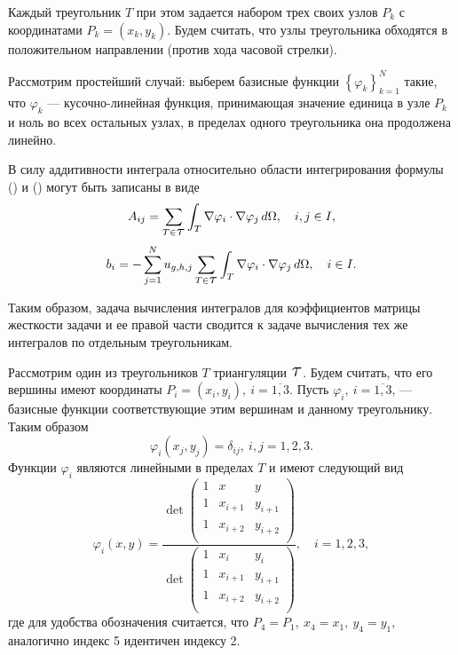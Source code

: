 \documentclass[12pt, a4paper]{article}
\renewcommand{\phi}{\varphi}
\newcommand\Tau{\scalerel*{\tau}{T}}
\begin{document}
				Каждый треугольник $T$ при этом задается набором трех своих узлов $P_k$ с координатами $P_k = (x_k, y_k)$. Будем считать, что узлы треугольника обходятся в положительном направлении (против хода часовой стрелки).
				
				Рассмотрим простейший случай: выберем базисные функции $\left\{ \phi_k \right\}_{k=1}^{N}$ такие, что $\phi_k$ --- кусочно-линейная функция, принимающая значение единица в узле $P_k$ и ноль во всех остальных узлах, в пределах одного треугольника она продолжена линейно.
				
				В силу аддитивности интеграла относительно области интегрирования  формулы () и () могут быть записаны в виде			
				\begin{equation}
					A_{ij} = \sum_{T \in \Tau}\int_{T} \nabla \phi_i \cdot \nabla \phi_j \, d\Omega,
					\quad i, j\in I,
					\label{A_stiff_second}				
				\end{equation}
				\begin{equation}
					b_i = - \sum_{j=1}^{N} u_{g,h, j} \sum_{T \in \Tau} \int_{T} \nabla \phi_i  \cdot \nabla \phi_j \, d\Omega, \quad i \in I.
					\label{b_stiff_second}
				\end{equation}
				
				Таким образом, задача вычисления интегралов для коэффициентов матрицы жесткости задачи и ее правой части сводится к задаче вычисления тех же интегралов по отдельным треугольникам.
				
				
				Рассмотрим один из треугольников $T$ триангуляции $\Tau$. Будем считать, что его вершины имеют координаты  $P_i = (x_i, y_i), \ i=\overline{1,3}$. Пусть $\phi_i, \ i=\overline{1,3}$, --- базисные функции соответствующие этим вершинам и данному треугольнику. Таким образом 
				\begin{equation*}
					\phi_i(x_j, y_j) = \delta_{ij}, \ i,j = 1,2,3.
				\end{equation*}
				Функции $\phi_i$ являются линейными в пределах $T$ и имеют следующий вид
				\begin{equation}
					\phi_i(x,y) = 
					\dfrac{
						\det{
							\begin{pmatrix}
								1 & x & y \\
								1 & x_{i+1} & y_{i+1} \\
								1 & x_{i+2} & y_{i+2} \\							
							 \end{pmatrix}
						 }
					}{
					\det{
						\begin{pmatrix}
							1 & x_{i} & y_{i} \\
							1 & x_{i+1} & y_{i+1} \\
							1 & x_{i+2} & y_{i+2} \\							
						\end{pmatrix}
						}
					}, \quad i = 1,2,3,
					\label{basis_fun_phi}
				\end{equation}
				где для удобства обозначения считается, что $P_4 = P_1, \ x_4 = x_1, \ y_4 = y_1, $ аналогично индекс 5 идентичен индексу 2.
				
\end{document}
